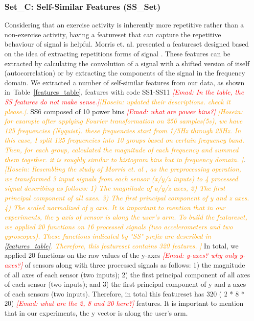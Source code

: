 \documentclass[journal,article,submit,moreauthors,pdftex]{Definitions/mdpi}
\newcommand{\emad}[1]{\textcolor{red}{{\it [Emad: #1]}}}
\newcommand{\hosein}[1]{\textcolor{orange}{{\it [Hosein: #1]}}}
\begin{document}
\subsubsection{Set\_C: Self-Similar Features (SS\_Set)}
Considering that an exercise activity is inherently more repetitive rather than a non-exercise activity, having a featureset that can capture the repetitive behaviour of signal is helpful. Morris et. al. presented a featureset designed based on the idea of extracting repetitions forms of signal \cite{morris2014recofit}. These features can be extracted by calculating the convolution of a signal with a shifted version of itself (autocorrelation) or by extracting the components of the signal in the frequency domain. We extracted a number of self-similar features from our data, as shown in~Table~\ref{features_table}, features with code SS1-SS11 \emad{In the table, the SS features do not make sense.}\hosein{updated their descriptions. check it please.}. SS6 composed of 10 power bins \emad{what are power bins?} \hosein{for example after applying Fourier transformation on 250 samples(5s), we have 125 frequencies (Nyquist). these frequencies start from 1/5Hz through 25Hz. In this case, I split 125 frequencies into 10 groups based on certain frequency band. Then, for each group, calculated the magnitude of each frequency and summed them together. it is roughly similar to histogram bins but in frequency domain. }.
\hosein{Resembling the study of Morris et. al \cite{morris2014recofit}, as the preprocessing operation, we transformed 3 input signals from each sensor (x/y/z inputs) to 4 processed signal describing as follows: 1) The magnitude of a/y/z axes, 2) The first principal component of all axes. 3) The first principal component of y and z axes. 4) The scaled normalized of y axis. It is important to mention that in our experiments, the y axis of sensor is along the user's arm. To build the featureset, we applied 20 functions on 16 processed signals (two accelerometers and two gyroscopes). These functions indicated by "SS" prefix are described in \ref{features_table}. Therefore, this featureset contains 320 features. }
In total, we applied 20 functions on the raw values of the y-axes \emad{y-axes? why only y-axes?} of sensors along with three processed signals as follows: 1) the magnitude of all axes of each sensor (two inputs); 2) the first principal component of all axes of each sensor (two inputs); and 3) the first principal component of y and z axes of each sensors (two inputs). Therefore, in total this featureset has 320 ( 2 * 8 * 20) \emad{what are the 2, 8 and 20 here?} features. It is important to mention that in our experiments, the y vector is along the user's arm. 
\end{document}
